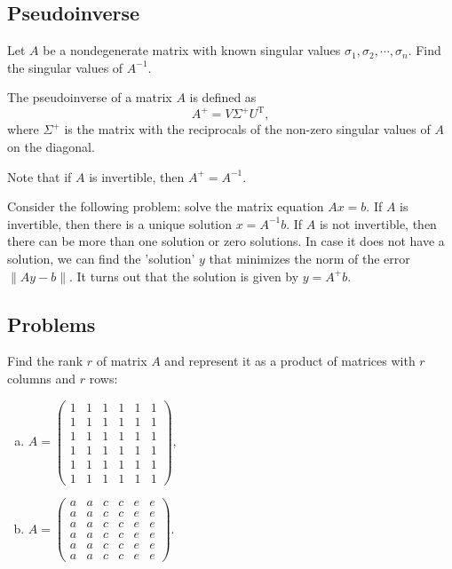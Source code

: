 \subsection{Pseudoinverse}

\begin{exercise}
Let $A$ be a nondegenerate matrix with known singular values $\sigma_1, \sigma_2, \cdots, \sigma_n$. Find the singular values of $A^{-1}$.
\end{exercise}

\begin{definition}
The pseudoinverse of a matrix $A$ is defined as
$$
A^+ = V \Sigma^+ U^{\mathrm T},
$$
where $\Sigma^+$ is the matrix with the reciprocals of the non-zero singular values of $A$ on the diagonal.
\end{definition}

Note that if $A$ is invertible, then $A^+ = A^{-1}$.

Consider the following problem: solve the matrix equation $Ax = b$. If $A$ is invertible, then there is a unique solution $x = A^{-1}b$. If $A$ is not invertible, then there can be more than one solution or zero solutions. In case it does not have a solution, we can find the 'solution' $y$ that minimizes the norm of the error $\|Ay - b\|$. It turns out that the solution is given by $y = A^+b$.

\subsection{Problems}

\begin{problem}
Find the rank $r$ of matrix $A$ and represent it as a product of matrices with $r$ columns and $r$ rows:
\begin{enumerate}[a) ]
    \item 
    $
    A=\begin{pmatrix}
        1 & 1 & 1 & 1 & 1 & 1 \\
        1 & 1 & 1 & 1 & 1 & 1 \\
        1 & 1 & 1 & 1 & 1 & 1 \\
        1 & 1 & 1 & 1 & 1 & 1 \\
        1 & 1 & 1 & 1 & 1 & 1 \\
        1 & 1 & 1 & 1 & 1 & 1
        \end{pmatrix},
    $
    \item 
    $
    A=\begin{pmatrix}
        a & a & c & c & e & e \\
        a & a & c & c & e & e \\
        a & a & c & c & e & e \\
        a & a & c & c & e & e \\
        a & a & c & c & e & e \\
        a & a & c & c & e & e
        \end{pmatrix}.
    $
\end{enumerate}
\end{problem}

